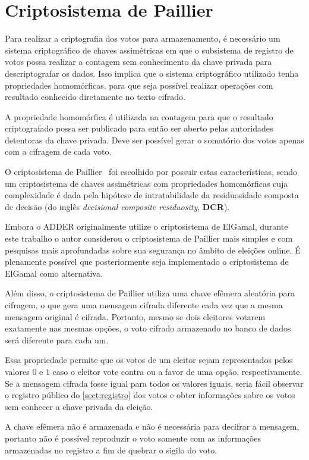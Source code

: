\section{Criptosistema de Paillier}

Para realizar a criptografia dos votos para armazenamento, é necessário um
sistema criptográfico de chaves assimétricas em que o subsistema de registro de
votos possa realizar a contagem sem conhecimento da chave privada para
descriptografar os dados. Isso implica que o sistema criptográfico utilizado
tenha propriedades homomórficas, para que seja possível realizar operações com
resultado conhecido diretamente no texto cifrado.

A propriedade homomórfica é utilizada na contagem para que o resultado
criptografado possa ser publicado para então ser aberto pelas autoridades
detentoras da chave privada. Deve ser possível gerar o somatório dos votos
apenas com a cifragem de cada voto.

O criptosistema de Paillier~\cite{paillier1999public} foi escolhido por possuir
estas características, sendo um criptosistema de chaves assimétricas com
propriedades homomórficas cuja complexidade é dada pela hipótese de
intratabilidade da residuosidade composta de decisão (do inglês
\textit{decisional composite residuosity}, \textbf{DCR}).

Embora o ADDER originalmente utilize o criptosistema de ElGamal, durante este
trabalho o autor considerou o criptosistema de Paillier mais simples e com
pesquisas mais aprofundadas sobre sua segurança no âmbito de eleições online. É
plenamente possível que posteriormente seja implementado o criptosistema de
ElGamal como alternativa.

Além disso, o criptosistema de Paillier utiliza uma chave efêmera aleatória
para cifragem, o que gera uma mensagem cifrada diferente cada vez que a mesma
mensagem original é cifrada. Portanto, mesmo se dois eleitores votarem
exatamente nas mesmas opções, o voto cifrado armazenado no banco de dados será
diferente para cada um.

Essa propriedade permite que os votos de um eleitor sejam representados pelos
valores $0$ e $1$ caso o eleitor vote contra ou a favor de uma opção,
respectivamente. Se a mensagem cifrada fosse igual para todos os valores
iguais, seria fácil observar o registro público do \autoref{sect:registro} dos
votos e obter informações sobre os votos sem conhecer a chave privada da
eleição.

A chave efêmera não é armazenada e não é necessária para decifrar a mensagem,
portanto não é possível reproduzir o voto somente com as informações
armazenadas no registro a fim de quebrar o sigilo do voto.
